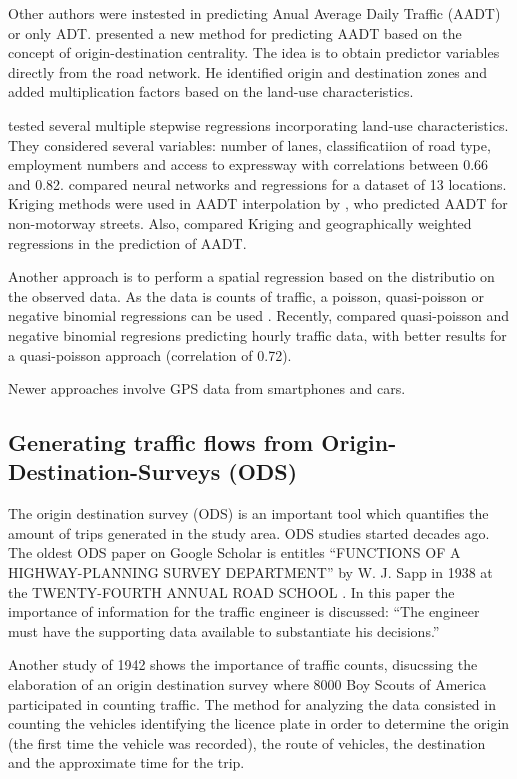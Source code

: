 \documentclass[12pt,graybox,envcountchap,sectrefs]{krantz}
\theoremstyle{definition}
\theoremstyle{definition}
\theoremstyle{definition}
\theoremstyle{remark}
\begin{document}
Other authors were instested in predicting Anual Average Daily Traffic
(AADT) or only ADT. \citet{lowry2014spatial} presented a new method for
predicting AADT based on the concept of origin-destination centrality.
The idea is to obtain predictor variables directly from the road
network. He identified origin and destination zones and added
multiplication factors based on the land-use characteristics.

\citet{zhao2001contributing} tested several multiple stepwise
regressions incorporating land-use characteristics. They considered
several variables: number of lanes, classificatiion of road type,
employment numbers and access to expressway with correlations between
0.66 and 0.82. \citet{lam2000estimation} compared neural networks and
regressions for a dataset of 13 locations. Kriging methods were used in
AADT interpolation by \citet{eom2006improving}, who predicted AADT for
non-motorway streets. Also, \citet{selby2013spatial} compared Kriging
and geographically weighted regressions in the prediction of AADT.

Another approach is to perform a spatial regression based on the
distributio on the observed data. As the data is counts of traffic, a
poisson, quasi-poisson or negative binomial regressions can be used
\citep{zeileis2008regression}. Recently, \citet{Ibarraetal2017a}
compared quasi-poisson and negative binomial regresions predicting
hourly traffic data, with better results for a quasi-poisson approach
(correlation of 0.72).

Newer approaches involve GPS data from smartphones and cars.

\subsection{Generating traffic flows from Origin-Destination-Surveys
(ODS)}\label{generating-traffic-flows-from-origin-destination-surveys-ods}

The origin destination survey (ODS) is an important tool which
quantifies the amount of trips generated in the study area. ODS studies
started decades ago. The oldest ODS paper on Google Scholar is entitles
``FUNCTIONS OF A HIGHWAY-PLANNING SURVEY DEPARTMENT'' by W. J. Sapp in
1938 at the TWENTY-FOURTH ANNUAL ROAD SCHOOL \citep{sapp1938runctions}.
In this paper the importance of information for the traffic engineer is
discussed: ``The engineer must have the supporting data available to
substantiate his decisions.''

Another study of 1942 shows the importance of traffic counts, disucssing
the elaboration of an origin destination survey where 8000 Boy Scouts of
America participated in counting traffic. The method for analyzing the
data consisted in counting the vehicles identifying the licence plate in
order to determine the origin (the first time the vehicle was recorded),
the route of vehicles, the destination and the approximate time for the
trip.
\end{document}
